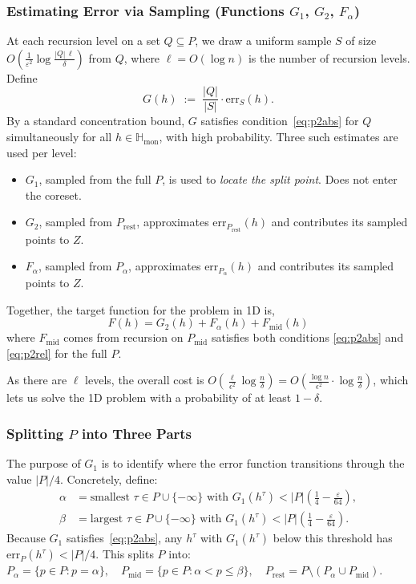 \documentclass[11pt, a4paper]{article}
\theoremstyle{boxed}
\newcommand{\Hmon}{\mathbb{H}_{\mathrm{mon}}}
\begin{document}
\subsubsection{Estimating Error via Sampling (Functions $G_1$, $G_2$, $F_\alpha$)}
At each recursion level on a set $Q \subseteq P$, we draw a uniform sample $S$ of size $O\!\left(\frac{1}{\varepsilon^2}\log\frac{|Q|\,\ell}{\delta}\right)$ from $Q$, where $\ell = O(\log n)$ is the number of recursion levels. Define
\[
  G(h) \;:=\; \frac{|Q|}{|S|}\cdot \mathrm{err}_S(h).
\]
By a standard concentration bound, $G$ satisfies condition~\eqref{eq:p2abs} for $Q$ simultaneously for all $h \in \Hmon$, with high probability. Three such estimates are used per level:
\begin{itemize}
  \item $G_1$, sampled from the full $P$, is used to \emph{locate the split point}. Does not enter the coreset.
  \item $G_2$, sampled from $P_{\mathrm{rest}}$, approximates $\mathrm{err}_{P_{\mathrm{rest}}}(h)$ and contributes its sampled points to $Z$.
  \item $F_\alpha$, sampled from $P_\alpha$, approximates $\mathrm{err}_{P_\alpha}(h)$ and contributes its sampled points to $Z$.
\end{itemize}

Together, the target function for the problem in 1D is, 
\[
F(h) = G_2(h) + F_\alpha(h) + F_{\mathrm{mid}}(h)
\]
where $F_{\mathrm{mid}}$ comes from recursion on $P_{\mathrm{mid}}$ satisfies both conditions \ref{eq:p2abs} and \ref{eq:p2rel} for the full $P$.

\medskip
As there are $\ell$ levels, the overall cost is $O\!\left(\frac{\ell}{\epsilon^2} \log \frac{n}{\delta}\right) = O\!\left(\frac{\log n}{\epsilon^2} \cdot \log \frac{n}{\delta}\right)$, which lets us solve the 1D problem with a probability of at least $1 - \delta$.
 
\subsubsection{Splitting $P$ into Three Parts}
 
The purpose of $G_1$ is to identify where the error function transitions through the value $|P|/4$. Concretely, define:
\begin{align*}
  \alpha &= \text{smallest } \tau \in P \cup \{-\infty\} \text{ with } G_1(h^\tau) < |P|\!\left(\tfrac{1}{4} - \tfrac{\varepsilon}{64}\right),\\
  \beta &= \text{largest } \tau \in P \cup \{-\infty\} \text{ with } G_1(h^\tau) < |P|\!\left(\tfrac{1}{4} - \tfrac{\varepsilon}{64}\right).
\end{align*}
Because $G_1$ satisfies~\eqref{eq:p2abs}, any $h^\tau$ with $G_1(h^\tau)$ below this threshold has $\mathrm{err}_P(h^\tau) < |P|/4$. This splits $P$ into:
$
  P_\alpha = \{p \in P : p = \alpha\}, \quad P_{\mathrm{mid}} = \{p \in P : \alpha < p \le \beta\}, \quad P_{\mathrm{rest}} = P \setminus (P_\alpha \cup P_{\mathrm{mid}}).
$
  
\end{document}
